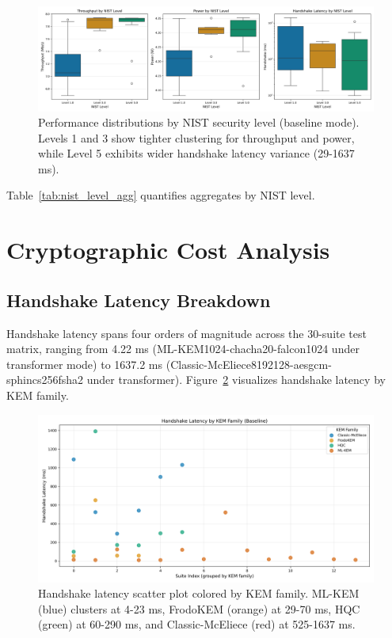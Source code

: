 \documentclass[11pt,a4paper]{article}
\begin{document}
\begin{figure}[H]
\centering
\includegraphics[width=\textwidth]{../figures/figure14_nist_level_aggregation_boxplot.png}
\caption{Performance distributions by NIST security level (baseline mode). Levels 1 and 3 show tighter clustering for throughput and power, while Level 5 exhibits wider handshake latency variance (29-1637 ms).}
\label{fig:nist_levels}
\end{figure}

Table~\ref{tab:nist_level_agg} quantifies aggregates by NIST level.



\section{Cryptographic Cost Analysis}

\subsection{Handshake Latency Breakdown}

Handshake latency spans four orders of magnitude across the 30-suite test matrix, ranging from 4.22 ms (ML-KEM1024-chacha20-falcon1024 under transformer mode) to 1637.2 ms (Classic-McEliece8192128-aesgcm-sphincs256fsha2 under transformer). Figure~\ref{fig:handshake_scatter} visualizes handshake latency by KEM family.

\begin{figure}[H]
\centering
\includegraphics[width=\textwidth]{../figures/figure07_handshake_latency_scatter.png}
\caption{Handshake latency scatter plot colored by KEM family. ML-KEM (blue) clusters at 4-23 ms, FrodoKEM (orange) at 29-70 ms, HQC (green) at 60-290 ms, and Classic-McEliece (red) at 525-1637 ms.}
\label{fig:handshake_scatter}
\end{figure}
\end{document}
